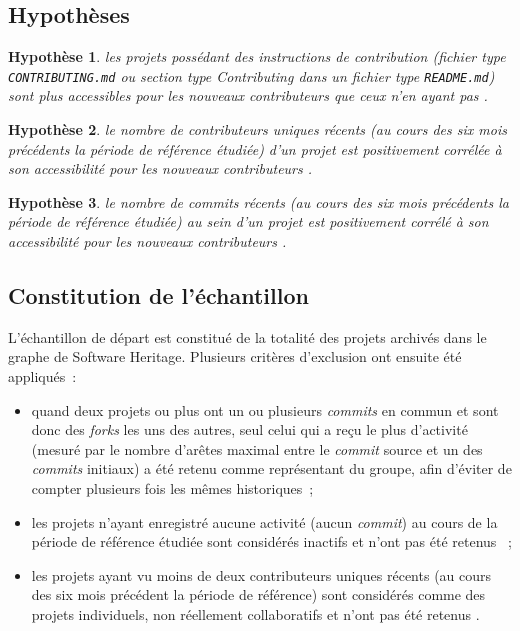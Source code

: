 \documentclass[dvipsnames,runningheads]{llncs}
\newcommand{\en}[1]{\foreignlanguage{english}{\emph{#1}}}
\newtheorem{hypo}{Hypothèse}[theorem]
\begin{document}
    \subsection{Hypothèses}

    \newcommand{\newhyp}[2]{%
        \begin{hypo}
            \label{hyp:#1}#2
        \end{hypo}%
    }

    \newhyp{contributionguidelines}{%
        les projets possédant des instructions de contribution (fichier type \texttt{CONTRIBUTING.md} ou
        section type \en{Contributing} dans un fichier type \texttt{README.md}) sont plus accessibles pour
        les nouveaux contributeurs que ceux n'en ayant pas \parencite[voir][p.~11]{signals-2019}.%
    }

    \newhyp{recentcontributorcount}{%
        le nombre de contributeurs uniques récents (au cours des six mois précédents la période de référence
        étudiée) d'un projet est positivement corrélée à son accessibilité pour les nouveaux contributeurs
        \parencite[voir][p.~12-13,16]{signals-2019}.%
    }

    \newhyp{recentcommitcount}{%
        le nombre de \en{commits} récents (au cours des six mois précédents la période de référence étudiée)
        au sein d'un projet est positivement corrélé à son accessibilité pour les nouveaux contributeurs
        \parencite[voir][p.~13,16]{signals-2019}.
    }

    \subsection{Constitution de l'échantillon}
    \label{sec:constitution_echantillon}

    L'échantillon de départ est constitué de la totalité des projets archivés dans le graphe de Software
    Heritage. Plusieurs critères d'exclusion ont ensuite été appliqués :

    \begin{itemize}
        \item quand deux projets ou plus ont un ou plusieurs \en{commits} en commun et sont donc des
            \en{forks} les uns des autres, seul celui qui a reçu le plus d'activité (mesuré par le nombre
            d'arêtes maximal entre le \en{commit} source et un des \en{commits} initiaux) a été retenu comme
            représentant du groupe, afin d'éviter de compter plusieurs fois les mêmes historiques ;
        \item les projets n'ayant enregistré aucune activité (aucun \en{commit}) au cours de la période de
            référence étudiée sont considérés inactifs et n'ont pas été retenus
            \parencite[voir][]{mining-github-2014} ;
        \item les projets ayant vu moins de deux contributeurs uniques récents (au cours des six mois
            précédent la période de référence) sont considérés comme des projets individuels, non réellement
            collaboratifs et n'ont pas été retenus \parencite[voir][]{mining-github-2014}.
    \end{itemize}
\end{document}
